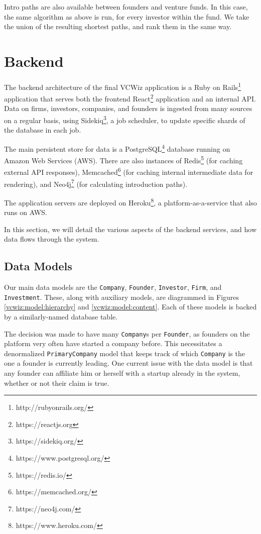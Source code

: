 Intro paths are also available between founders and venture funds. In this case, the same algorithm as above is run, for every investor within the fund. We take the union of the resulting shortest paths, and rank them in the same way.

\section{Backend}

The backend architecture of the final VCWiz application is a Ruby on Rails\footnote{http://rubyonrails.org/} application that serves both the frontend React\footnote{https://reactjs.org} application and an internal API. Data on firms, investors, companies, and founders is ingested from many sources on a regular basis, using Sidekiq\footnote{https://sidekiq.org/}, a job scheduler, to update specific shards of the database in each job.


The main persistent store for data is a PostgreSQL\footnote{https://www.postgresql.org/} database running on Amazon Web Services (AWS). There are also instances of Redis\footnote{https://redis.io/} (for caching external API responses), Memcached\footnote{https://memcached.org/} (for caching internal intermediate data for rendering), and Neo4j\footnote{https://neo4j.com/} (for calculating introduction paths).

The application servers are deployed on Heroku\footnote{https://www.heroku.com/}, a platform-as-a-service that also runs on AWS.

In this section, we will detail the various aspects of the backend services, and how data flows through the system.

\subsection{Data Models}

Our main data models are the \texttt{Company}, \texttt{Founder}, \texttt{Investor}, \texttt{Firm}, and \texttt{Investment}. These, along with auxiliary models, are diagrammed in Figures \ref{vcwiz:model:hierarchy} and \ref{vcwiz:model:content}. Each of these models is backed by a similarly-named database table.

The decision was made to have many \texttt{Company}s per \texttt{Founder}, as founders on the platform very often have started a company before. This necessitates a denormalized \texttt{PrimaryCompany} model that keeps track of which \texttt{Company} is the one a founder is currently leading. One current issue with the data model is that any founder can affiliate him or herself with a startup already in the system, whether or not their claim is true.

